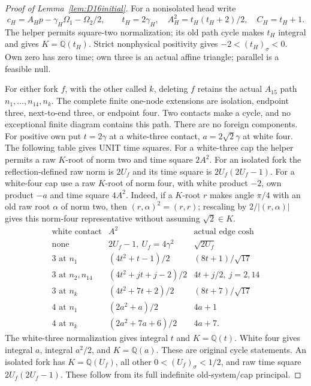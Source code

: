 \documentclass[11pt]{article}
\begin{document}
\begin{proof}[Proof of Lemma~\ref{lem:D16initial}]
For a nonisolated head write
\[
 c_H=A_Hp-\gamma_H\Omega_1-\Omega_2/2,\qquad
 t_H=2\gamma_H,\quad A_H^2=t_H(t_H+2)/2,\quad C_H=t_H+1.
\]
The helper permits square-two normalization; its old path cycle
makes $t_H$ integral and gives $K=\mathbb Q(t_H)$.
Strict nonphysical positivity gives $-2<(t_H)_\sigma<0$.
Own zero has zero time; own three is an actual affine triangle;
parallel is a feasible null.

For either fork $f$, with the other called $k$, deleting $f$
retains the actual $A_{15}$ path $n_1,\ldots,n_{14},n_k$.
The complete finite one-node extensions are isolation, endpoint
three, next-to-end three, or endpoint four. Two contacts make a
cycle, and no exceptional finite diagram contains this path.
There are no foreign components. For positive own put $t=2\gamma$
at a white-three contact, $a=2\sqrt2\gamma$ at white four.
The following table gives UNIT time squares. For a white-three cap
the helper permits a raw $K$-root of norm two and time square $2A^2$.
For an isolated fork the reflection-defined raw norm is $2U_f$ and
its time square is $2U_f(2U_f-1)$. For a white-four cap use a raw
$K$-root of norm four, with white product $-2$, own product $-a$
and time square $4A^2$. Indeed, if a $K$-root $r$ makes angle
$\pi/4$ with an old raw root $\alpha$ of norm two, then
$(r,\alpha)^2=(r,r)$; rescaling by $2/|(r,\alpha)|$ gives this
norm-four representative without assuming $\sqrt2\in K$.
\[
\begin{array}{c|c|c}
\text{white contact}&A^2&\text{actual edge cosh}\\\hline
\text{none}&2U_f-1,\ U_f=4\gamma^2&\sqrt{2U_f}\\
3\text{ at }n_1&(4t^2+t-1)/2&(8t+1)/\sqrt{17}\\
3\text{ at }n_2,n_{14}&(4t^2+jt+j-2)/2&4t+j/2,\ j=2,14\\
3\text{ at }n_k&(4t^2+7t+2)/2&(8t+7)/\sqrt{17}\\
4\text{ at }n_1&(2a^2+a)/2&4a+1\\
4\text{ at }n_k&(2a^2+7a+6)/2&4a+7 .
\end{array}
\]
The white-three normalization gives integral $t$ and $K=\mathbb Q(t)$.
White four gives integral $a$, integral $a^2/2$, and
$K=\mathbb Q(a)$. These are original cycle statements.
An isolated fork has $K=\mathbb Q(U_f)$, all other
$0<(U_f)_\sigma<1/2$, and raw time square $2U_f(2U_f-1)$.
These follow from its full indefinite old-system/cap principal.


\end{proof}
\end{document}
